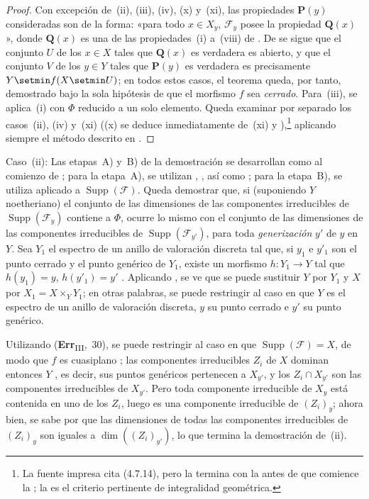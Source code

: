 \begin{proof}
Con excepción de~(ii), (iii), (iv), (x) y~(xi), las propiedades $\boldsymbol{P}(y)$ consideradas son de la forma: «para todo $x\in X_y$, $\mathcal F_y$ posee la propiedad $\boldsymbol{Q}(x)$», donde $\boldsymbol{Q}(x)$ es una de las propiedades~(i) a~(viii) de .
De  se sigue que el conjunto $U$ de los $x\in X$ tales que $\boldsymbol{Q}(x)$ es verdadera es abierto, y que el conjunto $V$ de los $y\in Y$ tales que $\boldsymbol{P}(y)$ es verdadera es precisamente $Y\setmin f(X\setmin U)$; en todos estos casos, el teorema queda, por tanto, demostrado bajo la sola hipótesis de que el morfismo $f$ sea \emph{cerrado}.
Para~(iii), se aplica~(i) con $\Phi$ reducido a un solo elemento.
Queda examinar por separado los casos~(ii), (iv) y~(xi) ((x) se deduce inmediatamente de~(xi) y ),\footnote{La fuente impresa cita (4.7.14), pero la {} termina con la {} antes de que comience la {}; la {} es el criterio pertinente de integralidad geométrica.} aplicando siempre el método descrito en .
\end{proof}

\begin{env}[12.2.1.1]
\label{IV.12.2.1.1}
Caso~(ii): Las etapas~A) y~B) de la demostración se desarrollan como al comienzo de ; para la etapa~A), se utilizan , , así como ; para la etapa~B), se utiliza  aplicado a $\operatorname{Supp}(\mathcal F)$.
Queda demostrar que, si (suponiendo $Y$ noetheriano) el conjunto de las dimensiones de las componentes irreducibles de $\operatorname{Supp}(\mathcal F_y)$ contiene a $\Phi$, ocurre lo mismo con el conjunto de las dimensiones de las componentes irreducibles de $\operatorname{Supp}(\mathcal F_{y'})$, para toda \emph{generización} $y'$ de $y$ en $Y$.
Sea $Y_1$ el espectro de un anillo de valoración discreta tal que, si $y_1$ e $y'_1$ son el punto cerrado y el punto genérico de $Y_1$, existe un morfismo $h:Y_1\to Y$ tal que $h(y_1)=y$, $h(y'_1)=y'$ .
Aplicando , se ve que se puede sustituir $Y$ por $Y_1$ y $X$ por $X_1=X\times_YY_1$; en otras palabras, se puede restringir al caso en que $Y$ es el espectro de un anillo de valoración discreta, $y$ su punto cerrado e $y'$ su punto genérico.

Utilizando (\textbf{Err}\textsubscript{III},~30), se puede restringir al caso en que $\operatorname{Supp}(\mathcal F)=X$, de modo que $f$ es cuasiplano ; las componentes irreducibles $Z_i$ de $X$ dominan entonces $Y$ , es decir, sus puntos genéricos pertenecen a $X_{y'}$, y los $Z_i\cap X_{y'}$ son las componentes irreducibles de $X_{y'}$.
Pero toda componente irreducible de $X_y$ está contenida en uno de los $Z_i$, luego es una componente irreducible de $(Z_i)_y$; ahora bien, se sabe por  que las dimensiones de todas las componentes irreducibles de $(Z_i)_y$ son iguales a $\dim((Z_i)_{y'})$, lo que termina la demostración de~(ii).
\end{env}

